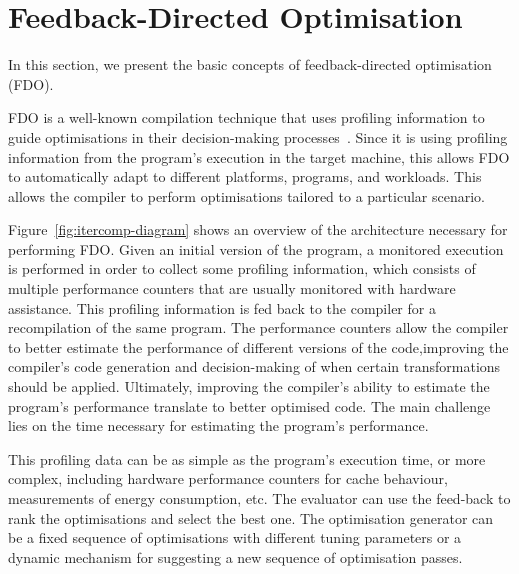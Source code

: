 
\section{Feedback-Directed Optimisation}

In this section, we present the basic concepts of feedback-directed optimisation (FDO).

FDO is a well-known compilation technique that uses profiling information to guide optimisations in their decision-making processes~\cite{ramasamy08,li10,chen16}.
Since it is using profiling information from the program's execution in the target machine, this allows FDO to 
automatically adapt to different platforms, programs, and workloads.
This allows the compiler to perform optimisations tailored to a particular scenario.

Figure~\ref{fig:itercomp-diagram} shows an overview of the architecture necessary for performing FDO.
Given an initial version of the program, a monitored execution is performed in order to collect some profiling information, which consists of multiple performance counters that are usually monitored with hardware assistance.
This profiling information is fed back to the compiler for a recompilation of the same program.
The performance counters allow the compiler to better estimate the performance of different versions of the code,improving the compiler's code generation and decision-making of when certain transformations should be applied.
Ultimately, improving the compiler's ability to estimate the program's performance translate to better optimised code.
The main challenge lies on the time necessary for estimating the program's performance. 

This profiling data can be as simple as the program's execution time, or more complex, including hardware performance counters for cache behaviour, measurements of energy consumption, etc.
The evaluator can use the feed-back to rank the optimisations and select the best one.
The optimisation generator can be a fixed sequence of optimisations with different tuning parameters or a dynamic mechanism for suggesting a new sequence of optimisation passes.

